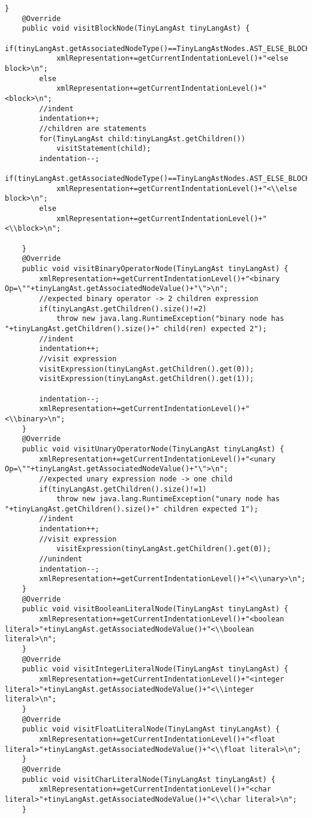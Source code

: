 \begin{lstlisting}[basicstyle=\miniscule,caption=Generating an XML representation of AST,label=listing:xmlGeneration]
	}
	@Override
	public void visitBlockNode(TinyLangAst tinyLangAst) {
		if(tinyLangAst.getAssociatedNodeType()==TinyLangAstNodes.AST_ELSE_BLOCK_NODE)
			xmlRepresentation+=getCurrentIndentationLevel()+"<else block>\n";			
		else
			xmlRepresentation+=getCurrentIndentationLevel()+"<block>\n";
		//indent
		indentation++;
		//children are statements
		for(TinyLangAst child:tinyLangAst.getChildren())
			visitStatement(child);
		indentation--;
		if(tinyLangAst.getAssociatedNodeType()==TinyLangAstNodes.AST_ELSE_BLOCK_NODE)
			xmlRepresentation+=getCurrentIndentationLevel()+"<\\else block>\n";			
		else 
			xmlRepresentation+=getCurrentIndentationLevel()+"<\\block>\n";			
				
	}
	@Override
	public void visitBinaryOperatorNode(TinyLangAst tinyLangAst) {
		xmlRepresentation+=getCurrentIndentationLevel()+"<binary Op=\""+tinyLangAst.getAssociatedNodeValue()+"\">\n";
		//expected binary operator -> 2 children expression
		if(tinyLangAst.getChildren().size()!=2)
			throw new java.lang.RuntimeException("binary node has "+tinyLangAst.getChildren().size()+" child(ren) expected 2");
		//indent
		indentation++;
		//visit expression
		visitExpression(tinyLangAst.getChildren().get(0));
		visitExpression(tinyLangAst.getChildren().get(1));

		indentation--;
		xmlRepresentation+=getCurrentIndentationLevel()+"<\\binary>\n";			
	}
	@Override
	public void visitUnaryOperatorNode(TinyLangAst tinyLangAst) {
		xmlRepresentation+=getCurrentIndentationLevel()+"<unary Op=\""+tinyLangAst.getAssociatedNodeValue()+"\">\n";
		//expected unary expression node -> one child
		if(tinyLangAst.getChildren().size()!=1)
			throw new java.lang.RuntimeException("unary node has "+tinyLangAst.getChildren().size()+" children expected 1");
		//indent
		indentation++;
		//visit expression
			visitExpression(tinyLangAst.getChildren().get(0));
		//unindent
		indentation--;
		xmlRepresentation+=getCurrentIndentationLevel()+"<\\unary>\n";				
	}
	@Override
	public void visitBooleanLiteralNode(TinyLangAst tinyLangAst) {
		xmlRepresentation+=getCurrentIndentationLevel()+"<boolean literal>"+tinyLangAst.getAssociatedNodeValue()+"<\\boolean literal>\n";			
	}
	@Override
	public void visitIntegerLiteralNode(TinyLangAst tinyLangAst) {
		xmlRepresentation+=getCurrentIndentationLevel()+"<integer literal>"+tinyLangAst.getAssociatedNodeValue()+"<\\integer literal>\n";	
	}
	@Override
	public void visitFloatLiteralNode(TinyLangAst tinyLangAst) {
		xmlRepresentation+=getCurrentIndentationLevel()+"<float literal>"+tinyLangAst.getAssociatedNodeValue()+"<\\float literal>\n";		
	}
	@Override
	public void visitCharLiteralNode(TinyLangAst tinyLangAst) {
		xmlRepresentation+=getCurrentIndentationLevel()+"<char literal>"+tinyLangAst.getAssociatedNodeValue()+"<\\char literal>\n";			
	}


\end{lstlisting}
